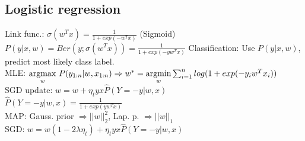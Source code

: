 \subsection*{Logistic regression}
Link func.: $\sigma(w^Tx) = \frac{1}{1+exp(-w^Tx)}$ (Sigmoid)\\
$P(y|x,w) = Ber(y; \sigma(w^Tx)) = \frac{1}{1+exp(-y w^T x)}$
Classification: Use $P(y|x,w)$, predict most likely class label.\\
MLE: $\underset{w}{\operatorname{argmax}} ~ P(y_{1:n}|w,x_{1:n})\\
\Rightarrow w^* = \underset{w}{\operatorname{argmin}} \sum_{i=1}^n log(1+exp(-y_i w^T x_i))$\\
SGD update: $w = w + \eta_t y x \hat{P}(Y = -y|w,x)$\\
$\hat{P}(Y = -y|w,x) = \frac{1}{1+exp(yw^Tx)}$\\
MAP: Gauss. prior $\Rightarrow ||w||_2^2$, Lap. p. $\Rightarrow||w||_1$\\
SGD: $w = w (1-2\lambda \eta_t) + \eta_t y x \hat{P}(Y = -y|w,x)$
